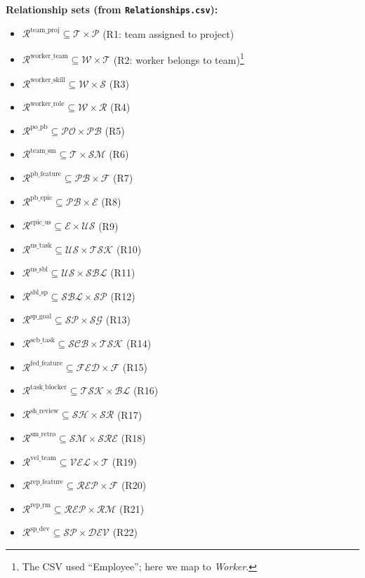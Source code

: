\documentclass[11pt,a4paper]{article}
\begin{document}
\noindent\textbf{Relationship sets (from \texttt{Relationships.csv}):}
\begin{itemize}[leftmargin=2em]
  \item $\mathcal{R}^{\text{team\_proj}} \subseteq \mathcal{T}\times\mathcal{P}$ (R1: team assigned to project)
  \item $\mathcal{R}^{\text{worker\_team}} \subseteq \mathcal{W}\times\mathcal{T}$ (R2: worker belongs to team)\footnote{The CSV used ``Employee''; here we map to \textit{Worker}.}
  \item $\mathcal{R}^{\text{worker\_skill}} \subseteq \mathcal{W}\times\mathcal{S}$ (R3)
  \item $\mathcal{R}^{\text{worker\_role}} \subseteq \mathcal{W}\times\mathcal{R}$ (R4)
  \item $\mathcal{R}^{\text{po\_pb}} \subseteq \mathcal{PO}\times\mathcal{PB}$ (R5)
  \item $\mathcal{R}^{\text{team\_sm}} \subseteq \mathcal{T}\times\mathcal{SM}$ (R6)
  \item $\mathcal{R}^{\text{pb\_feature}} \subseteq \mathcal{PB}\times\mathcal{F}$ (R7)
  \item $\mathcal{R}^{\text{pb\_epic}} \subseteq \mathcal{PB}\times\mathcal{E}$ (R8)
  \item $\mathcal{R}^{\text{epic\_us}} \subseteq \mathcal{E}\times\mathcal{US}$ (R9)
  \item $\mathcal{R}^{\text{us\_task}} \subseteq \mathcal{US}\times\mathcal{TSK}$ (R10)
  \item $\mathcal{R}^{\text{us\_sbl}} \subseteq \mathcal{US}\times\mathcal{SBL}$ (R11)
  \item $\mathcal{R}^{\text{sbl\_sp}} \subseteq \mathcal{SBL}\times\mathcal{SP}$ (R12)
  \item $\mathcal{R}^{\text{sp\_goal}} \subseteq \mathcal{SP}\times\mathcal{SG}$ (R13)
  \item $\mathcal{R}^{\text{scb\_task}} \subseteq \mathcal{SCB}\times\mathcal{TSK}$ (R14)
  \item $\mathcal{R}^{\text{fed\_feature}} \subseteq \mathcal{FED}\times\mathcal{F}$ (R15)
  \item $\mathcal{R}^{\text{task\_blocker}} \subseteq \mathcal{TSK}\times\mathcal{BL}$ (R16)
  \item $\mathcal{R}^{\text{sh\_review}} \subseteq \mathcal{SH}\times\mathcal{SR}$ (R17)
  \item $\mathcal{R}^{\text{sm\_retro}} \subseteq \mathcal{SM}\times\mathcal{SRE}$ (R18)
  \item $\mathcal{R}^{\text{vel\_team}} \subseteq \mathcal{VEL}\times\mathcal{T}$ (R19)
  \item $\mathcal{R}^{\text{rep\_feature}} \subseteq \mathcal{REP}\times\mathcal{F}$ (R20)
  \item $\mathcal{R}^{\text{rep\_rm}} \subseteq \mathcal{REP}\times\mathcal{RM}$ (R21)
  \item $\mathcal{R}^{\text{sp\_dev}} \subseteq \mathcal{SP}\times\mathcal{DEV}$ (R22)
\end{itemize}
\end{document}
